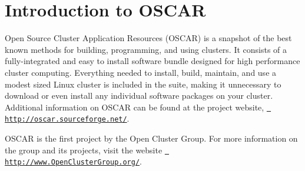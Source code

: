 %
%
%

\section{Introduction to OSCAR}

Open Source Cluster Application Resources (OSCAR) is a snapshot of the
best known methods for building, programming, and using clusters. It
consists of a fully-integrated and easy to install software bundle
designed for high performance cluster computing.  Everything needed to
install, build, maintain, and use a modest sized Linux cluster is
included in the suite, making it unnecessary to download or even
install any individual software packages on your cluster. Additional
information on OSCAR can be found at the project website,
\href{http://oscar.sourceforge.net/}{{\tt
http://oscar.sourceforge.net/}}.

OSCAR is the first project by the Open Cluster Group. For more
information on the group and its projects, visit the website
\href{http://www.openclustergroup.org/}{{\tt
http://www.OpenClusterGroup.org/}}.

